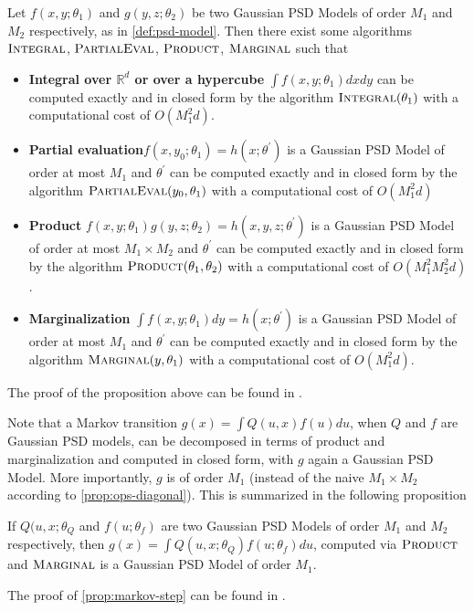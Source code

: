 \begin{proposition}\label{prop:ops-diagonal}
    Let $f(x, y; \theta_1)$ and $g(y, z; \theta_2)$ be two Gaussian PSD Models of order $M_1$ and $M_2$ respectively, as in \cref{def:psd-model}. Then there exist some algorithms $\operatorname{\textsc{Integral}}$, $\operatorname{\textsc{PartialEval}}$, $\operatorname{\textsc{Product}}$, $\operatorname{\textsc{Marginal}}$ such that
    \begin{itemize}
        \item \textbf{ Integral over $\mathbb R^d$ or over a hypercube} $\int f(x, y; \theta_1)dxdy$ can be computed exactly and in closed form by the algorithm $\operatorname{\textsc{Integral}}(\theta_1)$ with a computational cost of $O(M_1^2 d)$.
        \item \textbf{ Partial evaluation}$f(x, y_0; \theta_1) = h(x; \theta^\prime)$ is a Gaussian PSD Model of order at most $M_1$ and $\theta^\prime$ can be computed exactly and in closed form by the algorithm $\operatorname{\textsc{PartialEval}}(y_0, \theta_1)$ with a computational cost of $O(M_1^2 d)$
        \item \textbf{ Product} $f(x, y; \theta_1)g(y, z; \theta_2)=h(x, y, z; \theta^\prime)$ is a Gaussian PSD Model of order at most $M_1\times M_2$ and $\theta^\prime$  can be computed exactly and in closed form by the algorithm $\operatorname{\textsc{Product}}(\theta_1, \theta_2)$ with a computational cost of $O(M_1^2 M_2^2 d)$.
        \item \textbf{ Marginalization} $\int f(x, y; \theta_1)dy=h(x; \theta^\prime)$ is a Gaussian PSD Model of order at most $M_1$ and $\theta^\prime$ can be computed exactly and in closed form by the algorithm $\operatorname{\textsc{Marginal}}(y, \theta_1)$ with a computational cost of $O(M_1^2 d)$.
    \end{itemize}
\end{proposition}
The proof of the proposition above can be found in \citep[Appendix F]{ciliberto2021}.

Note that a Markov transition $g(x) = \int Q(u, x)f(u)du$, when $Q$ and $f$ are Gaussian PSD models, can be decomposed in terms of product and marginalization and computed in closed form, with $g$ again a Gaussian PSD Model. More importantly,  $g$ is of order $M_1$ (instead of the naive $M_1\times M_2$ according to \cref{prop:ops-diagonal}). This is summarized in the following proposition

\begin{proposition}\label{prop:markov-step}
   If $Q(u, x; \theta_Q$ and $f(u; \theta_f)$ are two Gaussian PSD Models of order $M_1$ and $M_2$ respectively, then $g(x) = \int Q(u, x;\theta_Q)f(u;\theta_f)du$, computed via $\operatorname{\textsc{Product}}$ and $\operatorname{\textsc{Marginal}}$ is a Gaussian PSD Model of order $M_1$.
\end{proposition}
The proof of \cref{prop:markov-step} can be found in \citep[Appendix F.5]{ciliberto2021}.

